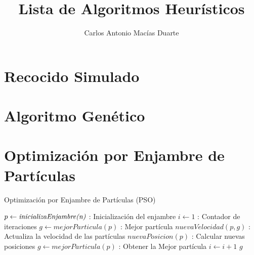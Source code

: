\documentclass[10pt,letterpaper,twoside,openright]{article}
\author{Carlos Antonio Macías Duarte}
\title{Lista de Algoritmos Heurísticos}
\begin{document}
	\maketitle
		
	\tableofcontents
	
	\section{Recocido Simulado}
	
	\section{Algoritmo Genético}
	
	\section{Optimización por Enjambre de Partículas}
	
		\begin{algorithm}[H]
			\caption{Optimización por Enjambre de Partículas (PSO)}
				$ p \leftarrow \emph{inicializaEnjambre(n)}$ : Inicialización del enjambre\;
				$ i \leftarrow 1 $ : Contador de iteraciones\;
				$ g \leftarrow mejorParticula(p) $ : Mejor partícula\;
				{
					$ nuevaVelocidad(p,g) $ : Actualiza la velocidad de las partículas\;
					$ nuevaPosicion(p) $ : Calcular nuevas posiciones\;
					$ g \leftarrow mejorParticula(p) $ : Obtener la Mejor partícula\;
					$ i \leftarrow  i + 1 $\;
				}
		 		\Return $ g $
		 \end{algorithm}
\end{document}
